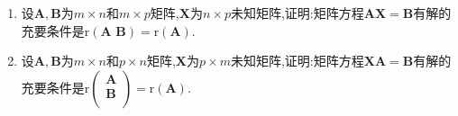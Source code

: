 \documentclass[../../main.tex]{subfiles}
\begin{document}
\begin{theorem}\label{theorem:矩阵方程有解的充要条件}
\begin{enumerate}
\item 设\(\boldsymbol{A},\boldsymbol{B}\)为\(m\times n\)和\(m\times p\)矩阵,\(\boldsymbol{X}\)为\(n\times p\)未知矩阵,证明:矩阵方程\(\boldsymbol{A}\boldsymbol{X}=\boldsymbol{B}\)有解的充要条件是\(\mathrm{r}\left( \boldsymbol{A}\,\,\boldsymbol{B} \right)=\mathrm{r}(\boldsymbol{A})\).

\item 设\(\boldsymbol{A},\boldsymbol{B}\)为\(m\times n\)和\(p\times n\)矩阵,\(\boldsymbol{X}\)为\(p\times m\)未知矩阵,证明:矩阵方程\(\boldsymbol{X}\boldsymbol{A}=\boldsymbol{B}\)有解的充要条件是\(\mathrm{r}\left( \begin{array}{c}
\boldsymbol{A}\\
\boldsymbol{B}\\
\end{array} \right) =\mathrm{r}\left( \boldsymbol{A} \right) \).
\end{enumerate}
\end{theorem}
\end{document}
